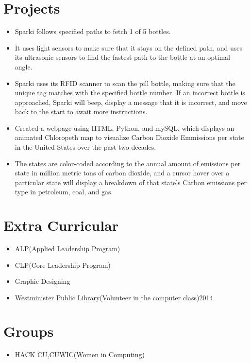 \documentclass[10pt,a4paper,sans]{moderncv} %
\begin{document}
\section {Projects}
\begin{itemize}
\item{Sparki follows specified paths to fetch 1 of 5 bottles.} 
\item{It uses light sensors to make sure that it stays on the defined path, and uses its ultrasonic sensors to find the fastest path to the bottle at an optimal angle.} 
\item{Sparki uses its RFID scanner to scan the pill bottle, making sure that the unique tag  matches with the specified bottle number. If an incorrect bottle is approached, Sparki will beep, display a message that it is incorrect, and move back to the start to await more instructions.}
\end{itemize}

\hfill \break
{}
\begin{itemize}
\item{ Created a webpage using HTML, Python, and mySQL, which displays an animated Chloropeth map to visualize Carbon Dioxide Emmissions per state in the United States over the past two decades.}
\item{The states are color-coded according to the annual amount of emissions per state in million metric tons of carbon dioxide, and a cursor hover over a particular state will display a breakdown of that state's Carbon emissions per type in petroleum, coal, and gas.}
\end{itemize}

\section{Extra Curricular}
\begin{itemize}
\item{}{ALP(Applied Leadership Program)}
\item{}{CLP(Core Leadership Program)}
\item{}{Graphic Designing}
\item{}{Westminister Public Library(Volunteer in the computer class){2014}}
\end{itemize}

\section{Groups}
\begin{itemize}
\item {}{HACK CU,CUWIC(Women in Computing)}
\end{itemize}

\end{document}

